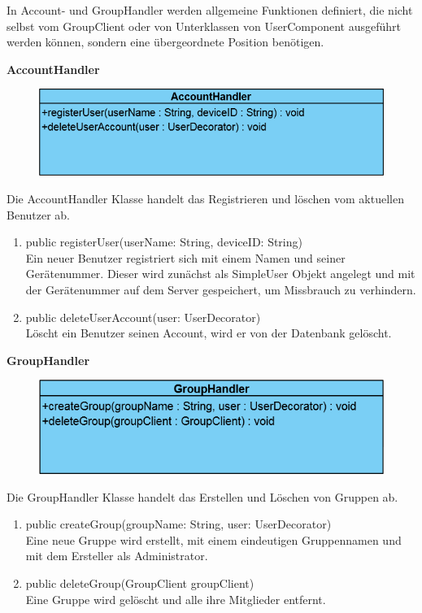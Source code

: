 In Account- und GroupHandler werden allgemeine Funktionen definiert, die nicht selbst vom GroupClient oder von Unterklassen von UserComponent ausgeführt werden können, sondern eine übergeordnete Position benötigen.

\textbf{AccountHandler}
\begin{figure}[H]
	\includegraphics[scale = .5]{res/umlClasses/AccoundHandler.png}
	\centering
\end{figure}
Die AccountHandler Klasse handelt das Registrieren und löschen vom aktuellen Benutzer ab.
\begin{enumerate}
	\item public registerUser(userName: String, deviceID: String)\\
		Ein neuer Benutzer registriert sich mit einem Namen und seiner Gerätenummer. Dieser wird zunächst als SimpleUser Objekt angelegt und mit der Gerätenummer auf dem Server gespeichert, um Missbrauch zu verhindern.
	\item public deleteUserAccount(user: UserDecorator)\\
		Löscht ein Benutzer seinen Account, wird er von der Datenbank gelöscht.
\end{enumerate}

\textbf{GroupHandler}
\begin{figure}[H]
	\includegraphics[scale = .55]{res/umlClasses/GroupHandler.png}
	\centering
\end{figure}
Die GroupHandler Klasse handelt das Erstellen und Löschen von Gruppen ab.
\begin{enumerate}
	\item public createGroup(groupName: String, user: UserDecorator)\\
		Eine neue Gruppe wird erstellt, mit einem eindeutigen Gruppennamen und mit dem Ersteller als Administrator.
	\item public deleteGroup(GroupClient groupClient)\\
		Eine Gruppe wird gelöscht und alle ihre Mitglieder entfernt.
\end{enumerate}


